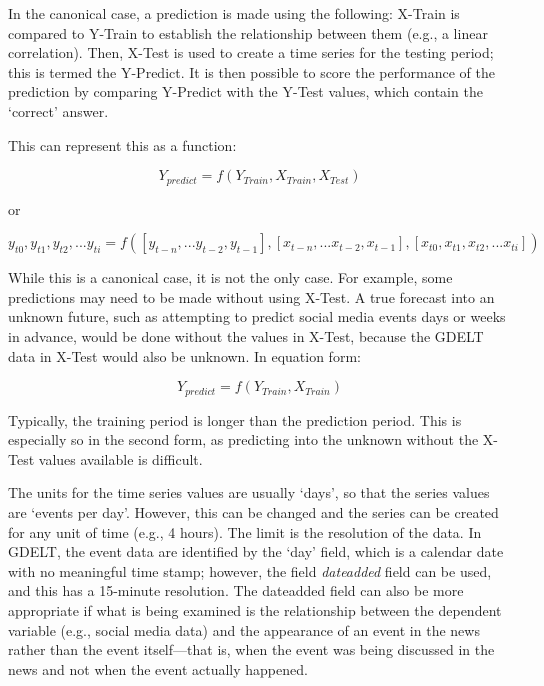 \par In the canonical case, %
 a prediction is made using the following: X-Train is compared to Y-Train to establish the relationship between them (e.g., a linear correlation). Then, X-Test is used to create a time series for the testing period; this is termed the Y-Predict. It is then possible to score the performance of the prediction by comparing Y-Predict with the Y-Test values, which contain the `correct' answer.

\par This can represent this as a function:

\begin{equation}
  Y_{predict} = f(Y_{Train},X_{Train},X_{Test})
\end{equation}

\par or

\begin{equation}
  y_{t0}, y_{t1}, y_{t2}, ... y_{ti} = f([y_{t-n}, ...y_{t-2}, y_{t-1}],[x_{t-n}, ...x_{t-2}, x_{t-1}],[x_{t0}, x_{t1}, x_{t2}, ... x_{ti}])
\end{equation}


\par While this is a canonical case, %
 it is not the only case. For example, some predictions may need to be made without using X-Test. A true forecast into an unknown future, such as attempting to predict social media events days or weeks in advance, would be done without the values in X-Test, because the GDELT data in X-Test would also be unknown. In equation form:

\begin{equation}
  Y_{predict} = f(Y_{Train},X_{Train})
\end{equation}

\par Typically, the training period is longer than the prediction period. This is especially so in the second form, as predicting into the unknown without the X-Test values available is difficult.

\par The units for the time series values are usually `days', so that the series values are `events per day'. However, this can be changed and the series can be created for any unit of time (e.g., 4 hours). The limit is the resolution of the data. In GDELT, the event data are identified by the `day' field, which is a calendar date with no meaningful time stamp; however, the field \textit{dateadded} field can be used, and this has a 15-minute resolution. The dateadded field can also be more appropriate if what is being examined is the relationship between the dependent variable (e.g., social media data) and the appearance of an event in the news rather than the event itself---that is, when the event was being discussed in the news and not when the event actually happened.

